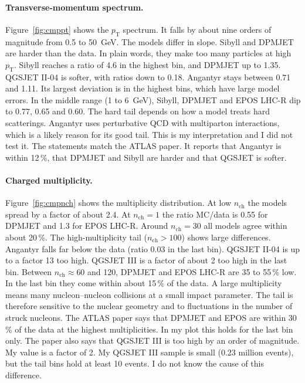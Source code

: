 \documentclass[11pt,a4paper]{article}
\newcommand{\pT}{\ensuremath{p_{\mathrm{T}}}}
\newcommand{\nch}{\ensuremath{n_{\mathrm{ch}}}}
\begin{document}
\paragraph{Transverse-momentum spectrum.}
Figure~\ref{fig:cmppt} shows the $\pT$ spectrum.
It falls by about nine orders of magnitude from 0.5 to 50~GeV.
The models differ in slope.
Sibyll and DPMJET are harder than the data.
In plain words, they make too many particles at high $\pT$.
Sibyll reaches a ratio of 4.6 in the highest bin, and DPMJET up to 1.35.
QGSJET II-04 is softer, with ratios down to 0.18.
Angantyr stays between 0.71 and 1.11.
Its largest deviation is in the highest bins, which have large model errors.
In the middle range (1 to 6~GeV), Sibyll, DPMJET and EPOS LHC-R dip to 0.77, 0.65 and 0.60.
The hard tail depends on how a model treats hard scatterings.
Angantyr uses perturbative QCD with multiparton interactions, which is a likely reason for its good tail.
This is my interpretation and I did not test it.
The statements match the ATLAS paper.
It reports that Angantyr is within 12\,\%, that DPMJET and Sibyll are harder and that QGSJET is softer.

\paragraph{Charged multiplicity.}
Figure~\ref{fig:cmpnch} shows the multiplicity distribution.
At low $\nch$ the models spread by a factor of about 2.4.
At $\nch=1$ the ratio MC/data is 0.55 for DPMJET and 1.3 for EPOS LHC-R.
Around $\nch=30$ all models agree within about 20\,\%.
The high-multiplicity tail ($\nch>100$) shows large differences.
Angantyr falls far below the data (ratio 0.03 in the last bin).
QGSJET II-04 is up to a factor 13 too high.
QGSJET III is a factor of about 2 too high in the last bin.
Between $\nch\approx60$ and 120, DPMJET and EPOS LHC-R are 35 to 55\,\% low.
In the last bin they come within about 15\,\% of the data.
A large multiplicity means many nucleon--nucleon collisions at a small impact parameter.
The tail is therefore sensitive to the nuclear geometry and to fluctuations in the number of struck nucleons.
The ATLAS paper says that DPMJET and EPOS are within 30\,\% of the data at the highest multiplicities.
In my plot this holds for the last bin only.
The paper also says that QGSJET III is too high by an order of magnitude.
My value is a factor of 2.
My QGSJET III sample is small (0.23 million events), but the tail bins hold at least 10 events.
I do not know the cause of this difference.
\end{document}
